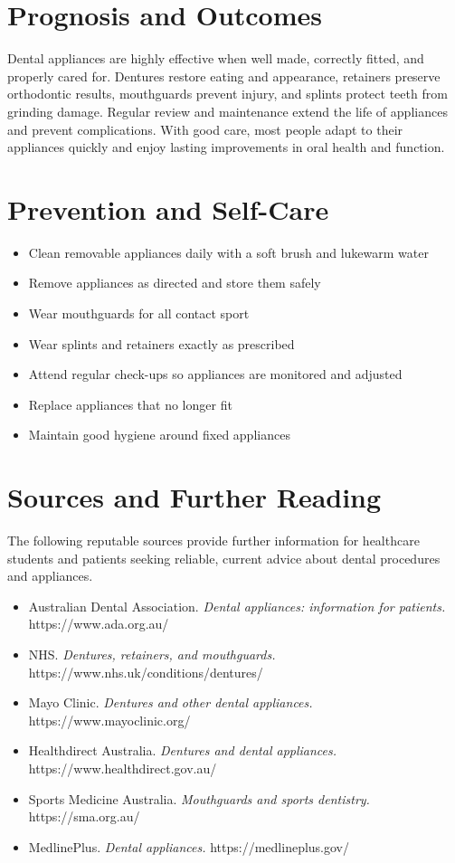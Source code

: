 \section*{Prognosis and Outcomes}
Dental appliances are highly effective when well made, correctly fitted, and properly cared for. Dentures restore eating and appearance, retainers preserve orthodontic results, mouthguards prevent injury, and splints protect teeth from grinding damage. Regular review and maintenance extend the life of appliances and prevent complications. With good care, most people adapt to their appliances quickly and enjoy lasting improvements in oral health and function.

\section*{Prevention and Self-Care}
\begin{itemize}
    \item Clean removable appliances daily with a soft brush and lukewarm water
    \item Remove appliances as directed and store them safely
    \item Wear mouthguards for all contact sport
    \item Wear splints and retainers exactly as prescribed
    \item Attend regular check-ups so appliances are monitored and adjusted
    \item Replace appliances that no longer fit
    \item Maintain good hygiene around fixed appliances
\end{itemize}

\section*{Sources and Further Reading}
The following reputable sources provide further information for healthcare students and patients seeking reliable, current advice about dental procedures and appliances.

\begin{itemize}
    \item Australian Dental Association. \textit{Dental appliances: information for patients.} https://www.ada.org.au/
    \item NHS. \textit{Dentures, retainers, and mouthguards.} https://www.nhs.uk/conditions/dentures/
    \item Mayo Clinic. \textit{Dentures and other dental appliances.} https://www.mayoclinic.org/
    \item Healthdirect Australia. \textit{Dentures and dental appliances.} https://www.healthdirect.gov.au/
    \item Sports Medicine Australia. \textit{Mouthguards and sports dentistry.} https://sma.org.au/
    \item MedlinePlus. \textit{Dental appliances.} https://medlineplus.gov/
\end{itemize}
